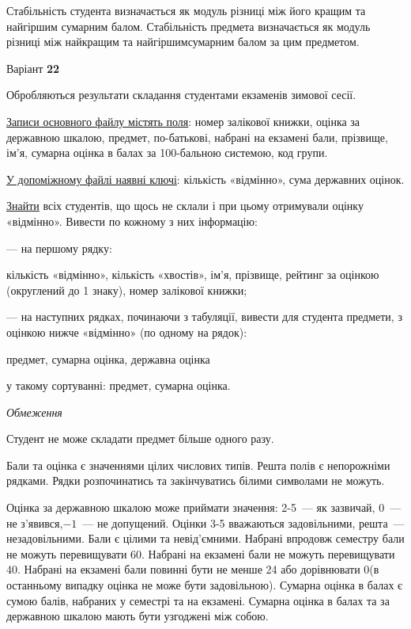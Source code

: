 \documentclass[11pt, ukrainian]{article}
\begin{document}
Стабільність студента визначається як модуль різниці між його кращим та найгіршим сумарним балом.
Стабільність предмета визначається як модуль різниці між найкращим та найгіршимсумарним балом за цим предметом.




\par
\newpage
{\center Варіант  \No \textbf { 22 }\par}
\bigskip
Обробляються результати складання студентами екзаменів зимової сесії.

\underline{Записи основного файлу містять поля}: номер залікової книжки, оцінка за державною шкалою, предмет, по-батькові, набрані на екзамені бали, прізвище, ім’я, сумарна оцінка в балах за 100-бальною системою, код групи.

\underline{У допоміжному файлі наявні ключі}: кількість «відмінно», сума державних оцінок.

\underline{Знайти} всіх студентів, що щось не склали і при цьому отримували оцінку «відмінно». Вивести по кожному з них інформацію:\par
{\noindent}--- на першому рядку:\par
кількість «відмінно», кількість «хвостів», ім’я, прізвище, рейтинг за оцінкою (округлений до 1 знаку), номер залікової книжки;

{\noindent}--- на наступних рядках, починаючи з табуляції, вивести для студента предмети, з оцінкою нижче «відмінно» (по одному на рядок):\par
предмет, сумарна оцінка, державна оцінка

{\noindent}у такому сортуванні: предмет, сумарна оцінка.


\bigskip\textit{Обмеження}

Студент не може складати предмет більше одного разу.

Бали та оцінка є значеннями цілих числових типів. Решта полів є непорожніми рядками.
Рядки розпочинатись та закінчуватись білими символами не можуть.

Оцінка за державною шкалою може приймати значення: 2-5~--- як зазвичай, 0~--- не з’явився,$-1$~--- не допущений. 
Оцінки 3-5 вважаються задовільними, решта~--- незадовільними. 
Бали є цілими та невід’ємними.
Набрані впродовж семестру бали не можуть перевищувати 60. 
Набрані на екзамені бали не можуть перевищувати 40. 
Набрані на екзамені бали повинні бути не менше 24 або дорівнювати 0(в останньому випадку оцінка не може бути задовільною). 
Сумарна оцінка в балах є сумою балів, набраних у семестрі та на екзамені.
Сумарна оцінка в балах та за державною шкалою мають бути узгоджені між собою.
\end{document}
